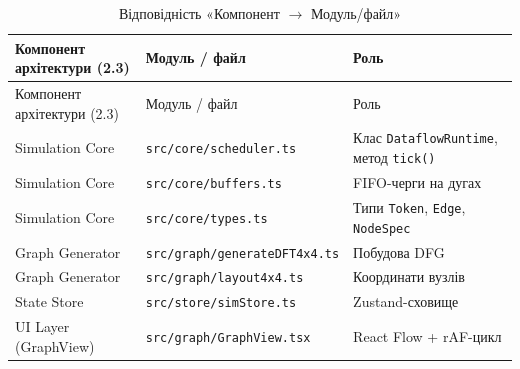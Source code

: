 \documentclass[
]{article}
\begin{document}
\begin{longtable}[]{@{}
  >{\raggedright\arraybackslash}p{}
  >{\raggedright\arraybackslash}p{}
  >{\raggedright\arraybackslash}p{}@{}}
\caption{Відповідність «Компонент \(\rightarrow\)
Модуль/файл»}\tabularnewline
\toprule\noalign{}
\begin{minipage}[b]{\linewidth}\raggedright
Компонент архітектури (2.3)
\end{minipage} & \begin{minipage}[b]{\linewidth}\raggedright
Модуль / файл
\end{minipage} & \begin{minipage}[b]{\linewidth}\raggedright
Роль
\end{minipage} \\
\midrule\noalign{}
\endfirsthead
\toprule\noalign{}
\begin{minipage}[b]{\linewidth}\raggedright
Компонент архітектури (2.3)
\end{minipage} & \begin{minipage}[b]{\linewidth}\raggedright
Модуль / файл
\end{minipage} & \begin{minipage}[b]{\linewidth}\raggedright
Роль
\end{minipage} \\
\midrule\noalign{}
\endhead
\bottomrule\noalign{}
\endlastfoot
Simulation Core &
\texttt{src}\texttt{/}\texttt{core}\texttt{/}\texttt{scheduler.ts} &
Клас \texttt{DataflowRuntime}, метод \texttt{tick}\texttt{()} \\
Simulation Core &
\texttt{src}\texttt{/}\texttt{core}\texttt{/}\texttt{buffers.ts} &
FIFO-черги на дугах \\
Simulation Core &
\texttt{src}\texttt{/}\texttt{core}\texttt{/}\texttt{types.ts} & Типи
\texttt{Token}, \texttt{Edge}, \texttt{NodeSpec} \\
Graph Generator &
\texttt{src}\texttt{/}\texttt{graph}\texttt{/generateDFT4x4.ts} &
Побудова DFG \\
Graph Generator &
\texttt{src}\texttt{/}\texttt{graph}\texttt{/layout4x4.ts} & Координати
вузлів \\
State Store &
\texttt{src}\texttt{/}\texttt{store}\texttt{/}\texttt{simStore.ts} &
Zustand-сховище \\
UI Layer (GraphView) &
\texttt{src}\texttt{/}\texttt{graph}\texttt{/}\texttt{GraphView.tsx} &
React Flow + rAF-цикл \\

\end{longtable}
\end{document}
